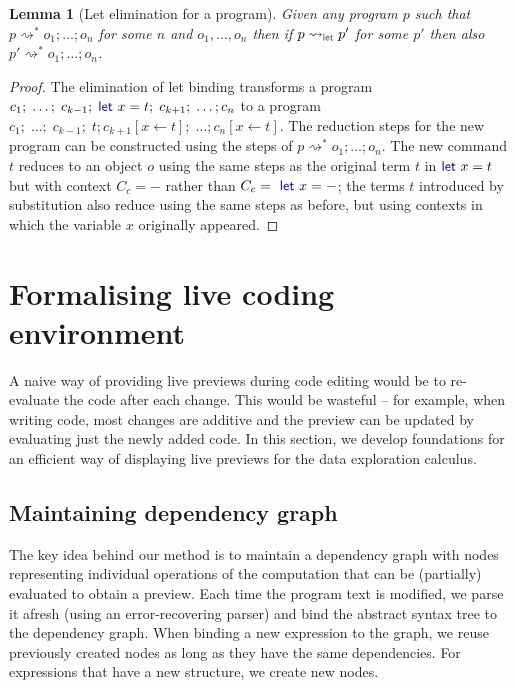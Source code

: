 \documentclass[acmsmall,anonymous,fleqn]{acmart}\settopmatter{printfolios=false,printccs=false,printacmref=false}
\newcounter{thc}
\theoremstyle{plain}
\newtheorem{lem}[thc]{Lemma}
\theoremstyle{definition}
\newcommand{\ident}[1]{\textnormal{\textcolor{idclr}{\sffamily #1}}}
\newcommand{\kvd}[1]{\textnormal{\textcolor{kvdclr}{\sffamily #1}}}
\begin{document}
\begin{lem}[Let elimination for a program]
\label{thm:let-lang-elimination}
Given any program $p$ such that $p \rightsquigarrow^{*} o_1;\ldots;o_n$ for some $n$ and $o_1, \ldots, o_n$
then if $p \rightsquigarrow_\ident{let} p'$ for some $p'$ then also $p' \rightsquigarrow^{*} o_1;\ldots;o_n$.
\end{lem}
\begin{proof}
The elimination of let binding transforms a program $c_1;\; \ldots;\; c_{k-1};\; \kvd{let}~x=t;\; c_{k+1};\; \ldots; c_n$
to a program $c_1;\; \ldots;\; c_{k-1};\; t; c_{k+1}[x\leftarrow t];\; \ldots; c_n[x\leftarrow t]$.
The reduction steps for the new program can be constructed using the steps of $p \rightsquigarrow^{*} o_1;\ldots;o_n$.
The new command $t$ reduces to an object $o$ using the same steps as the original term $t$
in $\kvd{let}~x=t$ but with context $C_c = -$ rather than $C_c = \kvd{let}~x=-$; the terms $t$
introduced by substitution also reduce using the same steps as before, but using
contexts in which the variable $x$ originally appeared.
\end{proof}

\newpage


\section{Formalising live coding environment}
\label{sec:formal}

A naive way of providing live previews during code editing would be to re-evaluate the code
after each change. This would be wasteful -- for example, when writing
code, most changes are additive and the preview can be updated by evaluating just the newly added
code. In this section, we develop foundations for an efficient way of displaying live previews
for the data exploration calculus.


\subsection{Maintaining dependency graph}
\label{sec:formal-deps}

The key idea behind our method is to maintain a dependency graph \cite{dependencies} with
nodes representing individual operations of the computation that can be (partially) evaluated
to obtain a preview. Each time the program text is modified, we parse it afresh (using an
error-recovering parser) and bind the abstract syntax tree to the dependency graph.
When binding a new expression to the graph, we reuse previously created nodes as long as
they have the same dependencies. For expressions that have a new structure, we create new nodes.
\end{document}
